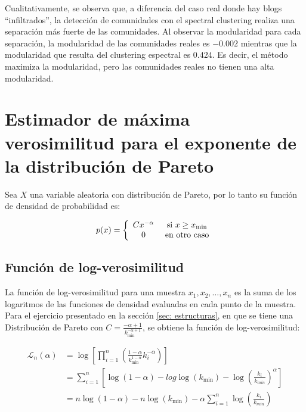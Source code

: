 \documentclass{article}
\begin{document}
Cualitativamente, se observa que, a diferencia del caso real donde hay blogs ``infiltrados'', la detección de comunidades con el spectral clustering realiza una separación más fuerte de las comunidades. Al observar la modularidad para cada separación, la modularidad de las comunidades reales es $-0.002$ mientras que la modularidad que resulta del clustering espectral es $0.424$. Es decir, el método maximiza la modularidad, pero las comunidades reales no tienen una alta modularidad.

\FloatBarrier
\section{Estimador de máxima verosimilitud para el exponente de la distribución de Pareto} \label{sec: pareto}


Sea $X$ una variable aleatoria con distribución de Pareto, por lo tanto su función de densidad de probabilidad es:

$$p(x) = \left\lbrace \begin{array}{c c} C x^{-\alpha} & \text{ si } x\geq x_\text{min} \\ 0 & \text{ en otro caso} \end{array}\right.$$

\subsection{Función de log-verosimilitud}


La función de log-verosimilitud para una muestra $x_1, x_2, \ldots, x_n$ es la suma de los logaritmos de las funciones de densidad evaluadas en cada punto de la muestra. Para el ejercicio presentado en la sección \ref{sec: estructuras}, en que se tiene una Distribución de Pareto con $C = \frac{-\alpha+1}{k_{\text{min}}^{-\alpha+1}}$, se obtiene la función de log-verosimilitud:

\begin{align}
    \mathcal{L}_n(\alpha) & = \log \left[\prod_{i=1}^{n} \left( \frac{1-\alpha}{k_{\text{min}}^{1-\alpha}} k_i^{-\alpha} \right) \right] \nonumber               \\
                          & = \sum_{i=1}^{n} \left[ \log(1-\alpha) - log\log(k_{\text{min}}) - \log \left(\frac{k_i}{k_{min}} \right)^{\alpha} \right] \nonumber \\
                          & = n \log(1-\alpha) - n\log(k_{\text{min}}) - \alpha \sum_{i=1}^{n} \log\left(\frac{k_i}{k_{min}} \right)
\end{align}
\end{document}
